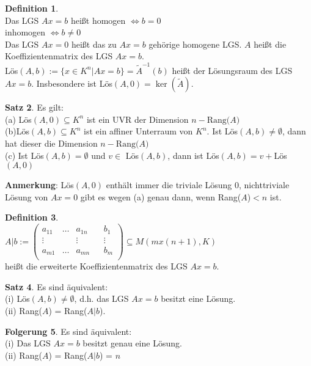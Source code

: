 \documentclass[10pt,a4paper,numbers=endperiod]{scrartcl}
\theoremstyle{definition}
\newtheorem{satz}{Satz}[section]
\newtheorem{defi}[satz]{Definition}
\newtheorem{folg}[satz]{Folgerung}
\begin{document}
\begin{defi}
	$ $\\
	Das LGS $Ax=b$ heißt homogen $\Leftrightarrow b = 0$\\
	\hspace*{33mm}inhomogen $\Leftrightarrow b \neq 0$\\
	Das LGS $Ax=0$ heißt das zu $Ax=b$ gehörige homogene LGS. $A$ heißt die Koeffizientenmatrix des LGS $Ax=b$.\\
	Lös$(A,b):= \{x \in K^n|Ax=b\}=\tilde{A}^{-1}(b)$ heißt der Lösungsraum des LGS $Ax=b$. Insbesondere ist Lös$(A,0)= \ker(\tilde{A})$.
\end{defi}
\newpage
\begin{satz}
	Es gilt:\\
	(a) Lös$(A,0) \subseteq K^n$ ist ein UVR der Dimension $n-\text{Rang($A$)}$\\
	(b)Lös$(A,b) \subseteq K^n$ ist ein affiner Unterraum von $K^n$. Ist Lös$(A,b) \neq \emptyset$, dann hat dieser die Dimension $n-\text{Rang($A$)}$\\
	(c) Ist Lös$(A,b) = \emptyset$ und $ v \in$ Lös$(A,b)$, dann ist Lös$(A,b) = v + $Lös$(A,0)$
\end{satz}

\textbf{Anmerkung}: Lös$(A,0)$ enthält immer die triviale Lösung 0, nichttriviale Lösung von $Ax=0$ gibt es wegen (a) genau dann, wenn Rang($A$)$<n$ ist.

\begin{defi}
	$ $\\
	
	$A|b := \begin{pmatrix}
	a_{11}&\dots&a_{1n}&&b_1\\
	\vdots&&\vdots&&\vdots\\
	a_{m1}&\dots&a_{mn}&&b_m\\
	\end{pmatrix} \subseteq M(mx(n+1),K)$\\
	
	heißt die erweiterte Koeffizientenmatrix des LGS $Ax=b$.
\end{defi}

\begin{satz}
	Es sind äquivalent:\\
	(i) Lös$(A,b) \neq \emptyset$, d.h. das LGS $Ax=b$ besitzt eine Lösung.\\
	(ii) Rang($A$) = Rang($A|b$).
\end{satz}

\begin{folg}
	Es sind äquivalent:\\
	(i) Das LGS $Ax=b$ besitzt genau eine Lösung.\\
	(ii) Rang($A$) = Rang($A|b$) = $n$
\end{folg}
\end{document}
